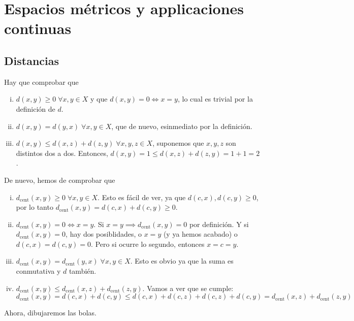 \chapter{Espacios m\'etricos y applicaciones continuas}
\section{Distancias}

\begin{ej}
	Hay que comprobar que
	\begin{enumerate}[i)]
		\item $ d(x,y) \geq 0 \; \forall x,y \in X $ y que $ d(x,y) = 0 \iff x = y $, lo cual es trivial por la definición de $ d $.
		\item $ d(x,y) = d(y,x) \; \forall x, y \in X $, que de nuevo, esinmediato por la definición.
		\item $ d(x,y) \leq d(x,z) + d(z,y) \; \forall x, y, z \in X $, suponemos que $ x, y, z $ son distintos dos a dos. Entonces,
			$ d(x,y) = 1 \leq d(x, z) + d(z, y) = 1 + 1 = 2 $.
	\end{enumerate}
\end{ej}

\begin{ej}
	De nuevo, hemos de comprobar que
	\begin{enumerate}[i)]
		\item $d_{\text{cent}}(x, y) \geq 0 \; \forall x, y \in X$. Esto es fácil de ver, ya que $d(c, x), d(c,y) \geq 0$, por lo tanto
			$d_{\text{cent}}(x,y) = d(c,x) + d(c,y) \geq 0$.
		\item $d_{\text{cent}}(x, y) = 0 \iff x = y$. Si $x = y \implies d_{\text{cent}}(x,y) = 0$ por definición. Y si $d_{\text{cent}}(x,y) = 0$,
			hay dos posiblidades, o $x = y$ (y ya hemos acabado) o $d(c, x) = d(c,y) = 0$. Pero si ocurre lo segundo, entonces $x = c = y$.
		\item $d_{\text{cent}}(x, y) = d_{\text{cent}}(y, x) \; \forall x, y \in X$. Esto es obvio ya que la suma es conmutativa y $d$ tambi\'en.
		\item $d_{\text{cent}}(x,y) \leq d_{\text{cent}}(x, z) + d_{\text{cent}}(z, y)$. Vamos a ver que se cumple:
			\[
				d_{\text{cent}}(x, y) = d(c,x) + d(c,y) \leq d(c,x) + d(c,z) + d(c,z) + d(c,y) =
				d_{\text{cent}}(x, z) + d_{\text{cent}}(z,y)
			\]
	\end{enumerate}
	Ahora, dibujaremos las bolas.
	\begin{center}
		
	\end{center}
\end{ej}

